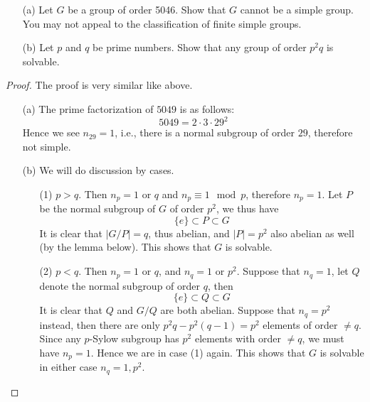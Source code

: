 \begin{prob}[F2011-Q1]
    \phantom{}
        \begin{itemize}
            \item[(a)] Let \( G \) be a group of order 5046. Show that \( G \) cannot be a simple group. You may not appeal to the classification of finite simple groups.
            
            \item[(b)] Let \( p \) and \( q \) be prime numbers. Show that any group of order \( p^2q \) is solvable.
        \end{itemize}   
\end{prob}
\begin{proof} 
    The proof is very similar like above.
    \begin{itemize}
        \item[(a)] The prime factorization of $5049$ is as follows:
        \begin{equation*}
            5049=2\cdot 3\cdot 29^2
        \end{equation*}
        Hence we see $n_{29}=1$, i.e., there is a normal subgroup of order $29$, therefore not simple.
        \item[(b)] We will do discussion by cases.
        \begin{itemize}
            \item[(1)] $p>q$. Then $n_p=1$ or $q$ and $n_p\equiv 1\mod p$, therefore $n_p=1$. Let $P$ be the normal subgroup of $G$ of order $p^2$, we thus have 
            \begin{equation*}
                \{e\}\subset P\subset G
            \end{equation*}
            It is clear that $|G/P|=q$, thus abelian, and $|P|=p^2$ also abelian as well (by the lemma below). This shows that $G$ is solvable.
            \item[(2)] $p<q$. Then $n_p=1$ or $q$, and $n_q=1$ or $p^2$. Suppose that $n_q=1$, let $Q$ denote the normal subgroup of order $q$, then 
            \begin{equation*}
                \{e\}\subset Q\subset G
            \end{equation*}
            It is clear that $Q$ and $G/Q$ are both abelian. Suppose that $n_q=p^2$ instead, then there are only $p^2q-p^2(q-1)=p^2$ elements of order $\neq q$. Since any $p$-Sylow subgroup has $p^2$ elements with order $\neq q$, we must have $n_p=1$. 
            Hence we are in case (1) again. This shows that $G$ is solvable in either case $n_q=1, p^2$.
        \end{itemize}
    \end{itemize}
\end{proof}


